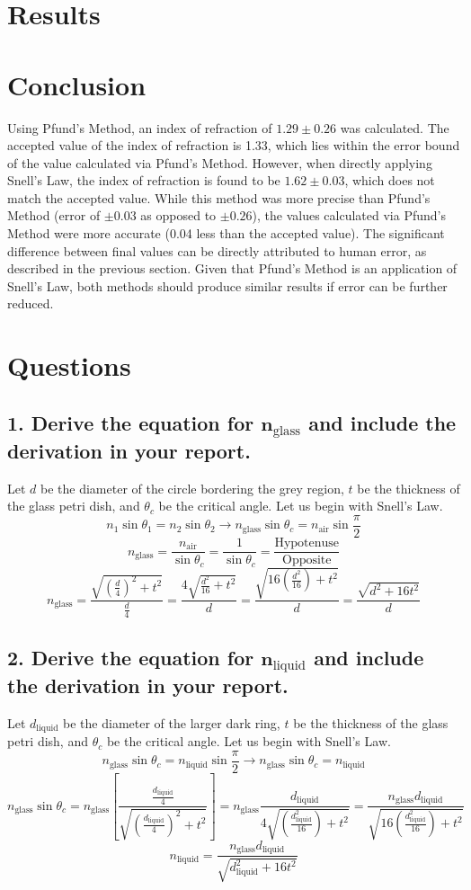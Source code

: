 \documentclass[12pt]{article}
\begin{document}
\section{Results}

\newpage
\section{Conclusion}
Using Pfund's Method, an index of refraction of $1.29\pm0.26$ was calculated. The accepted value of the index of refraction is 1.33, which lies within the error bound of the value calculated via Pfund's Method. However, when directly applying Snell's Law, the index of refraction is found to be $1.62\pm0.03$, which does not match the accepted value. While this method was more precise than Pfund's Method (error of $\pm0.03$ as opposed to $\pm0.26$), the values calculated via Pfund's Method were more accurate (0.04 less than the accepted value). The significant difference between final values can be directly attributed to human error, as described in the previous section. 
Given that Pfund's Method is an application of Snell's Law, both methods should produce similar results if error can be further reduced.
\newpage
\section{Questions}
\subsection*{1. Derive the equation for $\bm n_\text{glass}$ and include the derivation in your report.}
    Let $d$ be the diameter of the circle bordering the grey region, $t$ be the thickness of the glass petri dish, and $\theta_c$ be the critical angle. Let us begin with Snell's Law.
    \[n_1\sin{\theta_1}=n_2\sin{\theta_2}\rightarrow n_{\text{glass}}\sin{\theta_c}=n_{\text{air}}\sin{\frac{\pi}{2}}\]
    \[n_{\text{glass}}=\frac{n_{\text{air}}}{\sin\theta_c}=\frac{1}{\sin\theta_c}=\frac{\text{Hypotenuse}}{\text{Opposite}}\]
    \[n_{\text{glass}}=\frac{\sqrt{\left(\frac{d}{4}\right)^2+t^2}}{\frac{d}{4}}=\frac{4\sqrt{\frac{d^2}{16}+t^2}}{d}=\frac{\sqrt{16\left(\frac{d^2}{16}\right)+t^2}}{d}=\frac{\sqrt{d^2+16t^2}}{d}\]
\subsection*{2. Derive the equation for $\bm n_{\text{liquid}}$ and include the derivation in your report.}
    Let $d_{\text{liquid}}$ be the diameter of the larger dark ring, $t$ be the thickness of the glass petri dish, and $\theta_c$ be the critical angle. Let us begin with Snell's Law.
    \[n_{\text{glass}}\sin{\theta_c}=n_{\text{liquid}}\sin{\frac{\pi}{2}}\rightarrow n_{\text{glass}}\sin\theta_c=n_{\text{liquid}}\]
    \[n_{\text{glass}}\sin{\theta_c}=n_{\text{glass}}\left[\frac{\frac{d_{\text{liquid}}}{4}}{\sqrt{\left(\frac{d_{\text{liquid}}}{4}\right)^2+t^2}}\right]=n_{\text{glass}}\frac{d_{\text{liquid}}}{4\sqrt{\left(\frac{d^2_\text{liquid}}{16}\right)+t^2}}=\frac{n_{\text{glass}}d_{\text{liquid}}}{\sqrt{16\left(\frac{d_{\text{liquid}}^2}{16}\right)+t^2}}\]
    \[n_{\text{liquid}}=\frac{n_{\text{glass}}d_\text{liquid}}{\sqrt{d^2_{\text{liquid}}+16t^2}}\]
\end{document}
